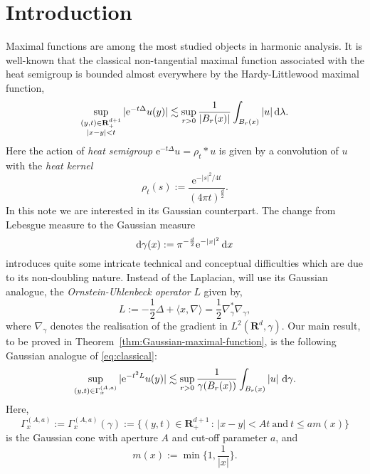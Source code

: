 \documentclass{amsart}
\theoremstyle{remark}
\newcommand{\D}{\,\textup{d}}
\newcommand{\la}{\langle}
\newcommand{\ra}{\rangle}
\renewcommand{\leq}{\leqslant}
\renewcommand{\leq}{\leqslant}
\newcommand{\R}{\mathbf R}
\newcommand{\e}{\mathrm{e}} %
\renewcommand{\leq}{\leqslant}%
\begin{document}
\section{Introduction}
Maximal functions are among the most studied objects in harmonic
analysis. 
It is well-known that the classical non-tangential maximal
function associated with the heat semigroup is bounded almost everywhere
by the Hardy-Littlewood maximal function, 
\begin{equation}\label{eq:classical}
  \sup_{\substack{(y, t) \in   \R^{d + 1}_+\\ |x - y| < t}} |\e^{-t \Delta} u(y)| \lesssim \sup_{r
    > 0}  \frac1{|B_r(x)|}\int_{B_r(x)} |u| \D\lambda.
\end{equation}
Here the action of \emph{heat semigroup} $\e^{-t \Delta} u = \rho_t \ast u$ is
given by a convolution of $u$ with the \emph{heat kernel}
\begin{equation*}
  \rho_t(s) := \frac{\e^{-|s|^2/4t}}{(4\pi t)^{\frac{d}2}}.
\end{equation*}
In this note we are interested in its Gaussian counterpart. The change from Lebesgue measure to the Gaussian measure
\begin{equation}
  \label{eq:Gaussian-measure}
  \mathrm{d}\gamma(x) := \pi^{-\frac{d}2} \e^{-|x|^2} \D{x}
\end{equation}
introduces quite some intricate technical and conceptual difficulties which are
due to its non-doubling nature. Instead of the Laplacian, will use its Gaussian
analogue, the \emph{Ornstein-Uhlenbeck operator} $L$ given by,
\begin{equation}
  \label{eq:Ornstein-Uhlenbeck-operator}
  L := -\frac12 \Delta + \la x, \nabla \ra = \frac12 \nabla_\gamma^* \nabla_\gamma,
\end{equation}
where $\nabla_\gamma$ denotes the realisation of the gradient in $L^2(\R^d,\gamma)$.
Our main result, to be proved in Theorem~\ref{thm:Gaussian-maximal-function},
is the following Gaussian analogue of \eqref{eq:classical}:
\begin{equation}
  \label{eq:main}
  \sup_{(y, t) \in \Gamma_x^{(A, a)}} |\e^{-t^2 L} u(y)| \lesssim \sup_{r > 0}
  \frac1{\gamma(B_r(x))}\int_{B_r(x)} |u| \, \D\gamma.
\end{equation}
Here, 
\begin{equation}
  \label{eq:Gaussian-cone}
  \Gamma_x^{(A, a)} := \Gamma_x^{(A, a)}(\gamma) := \{(y, t) \in \R^{d + 1}_+ \,: \, |x - y| < At \:\text{and}\: t \leq a m(x)\}
\end{equation}
is the Gaussian cone with aperture $A$ and cut-off parameter $a$, and 
\begin{equation}\label{eq:m-function}
  m(x) := \min\biggl\{1, \frac1{|x|} \biggr\}. %
\end{equation}
\end{document}
